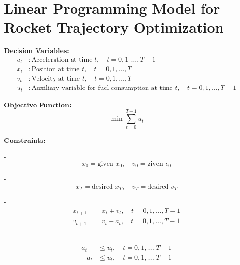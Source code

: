 \documentclass{article}
\begin{document}
\section*{Linear Programming Model for Rocket Trajectory Optimization}

\textbf{Decision Variables:}
\begin{align*}
a_t &: \text{Acceleration at time } t, \quad t = 0, 1, \ldots, T-1 \\
x_t &: \text{Position at time } t, \quad t = 0, 1, \ldots, T \\
v_t &: \text{Velocity at time } t, \quad t = 0, 1, \ldots, T \\
u_t &: \text{Auxiliary variable for fuel consumption at time } t, \quad t = 0, 1, \ldots, T-1
\end{align*}

\textbf{Objective Function:}
\[
\min \sum_{t=0}^{T-1} u_t
\]

\textbf{Constraints:}

- 
\[
x_0 = \text{given } x_0, \quad v_0 = \text{given } v_0
\]

- 
\[
x_T = \text{desired } x_T, \quad v_T = \text{desired } v_T
\]

- 
\begin{align*}
x_{t+1} &= x_t + v_t, \quad t = 0, 1, \ldots, T-1 \\
v_{t+1} &= v_t + a_t, \quad t = 0, 1, \ldots, T-1
\end{align*}

- 
\begin{align*}
a_t &\leq u_t, \quad t = 0, 1, \ldots, T-1 \\
-a_t &\leq u_t, \quad t = 0, 1, \ldots, T-1
\end{align*}
\end{document}
